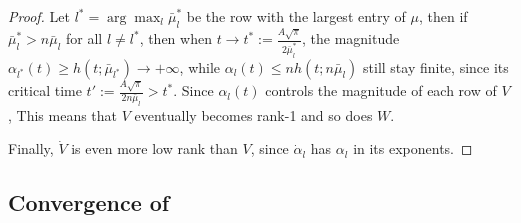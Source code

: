 \begin{proof}
Let $l^* = \arg\max_l \bar\mu_l^*$ be the row with the largest entry of $\mu$, then if $\bar\mu_l^* > n\bar\mu_l$ for all $l\neq l^*$, then when $t \rightarrow t^* := \frac{A\sqrt{\pi}}{2\bar\mu_l^*}$, the magnitude $\alpha_{l^*}(t) \ge h(t;\bar\mu_{l^*}) \rightarrow +\infty$, while $\alpha_l(t) \le n h (t; n\bar\mu_l)$ still stay finite, since its critical time $t' := \frac{A\sqrt{\pi}}{2n\bar\mu_l} > t^*$. Since $\alpha_l(t)$ controls the magnitude of each row of $V$, This means that $V$ eventually becomes rank-1 and so does $W$. 

Finally, $\dot V$ is even more low rank than $V$, since $\dot \alpha_l$ has $\alpha_l$ in its exponents. 
\end{proof}

\subsection{Convergence of \lowrank{}}
\convgpg*
